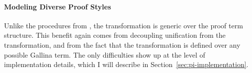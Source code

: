 \paragraph{Modeling Diverse Proof Styles}
Unlike the procedures from \sysname, the \toolnamec transformation is generic over the proof term structure.
This benefit again comes from decoupling unification from the transformation,
and from the fact that the transformation is defined over any possible Gallina term.
The only difficulties show up at the level of implementation details,
which I will describe in Section~\ref{sec:pi-implementation}.

